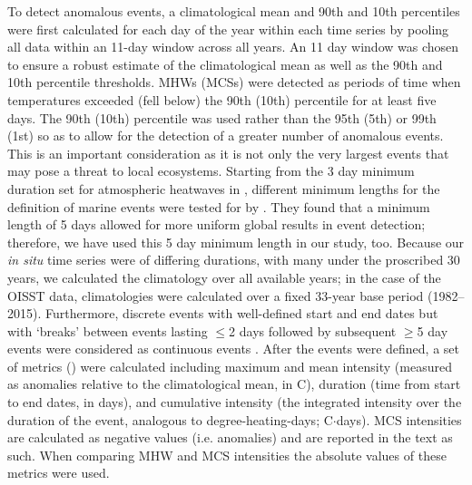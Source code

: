 \documentclass[a4paper,10pt,review]{elsarticle}
\begin{document}
To detect anomalous events, a climatological mean and 90th and 10th percentiles were first calculated for each day of the year within each time series by pooling all data within an 11-day window across all years. An 11 day window was chosen to ensure a robust estimate of the climatological mean as well as the 90th and 10th percentile thresholds. MHWs (MCSs) were detected as periods of time when temperatures exceeded (fell below) the 90th (10th) percentile for at least five days. The 90th (10th) percentile was used rather than the 95th (5th) or 99th (1st) so as to allow for the detection of a greater number of anomalous events. This is an important consideration as it is not only the very largest events that may pose a threat to local ecosystems. Starting from the 3 day minimum duration set for atmospheric heatwaves in \citet{Perkins2013}, different minimum lengths for the definition of marine events were tested for by \citet{Hobday2016}. They found that a minimum length of 5 days allowed for more uniform global results in event detection; therefore, we have used this 5 day minimum length in our study, too. Because our \emph{in situ} time series were of differing durations, with many under the proscribed 30 years, we calculated the climatology over all available years; in the case of the OISST data, climatologies were calculated over a fixed 33-year base period (1982--2015). Furthermore, discrete events with well-defined start and end dates but with `breaks' between events lasting $\leq$2 days followed by subsequent $\geq$5 day events were considered as continuous events \citep{Hobday2016}. After the events were defined, a set of metrics () were calculated including maximum and mean intensity (measured as anomalies relative to the climatological mean, in \degree C), duration (time from start to end dates, in days), and cumulative intensity (the integrated intensity over the duration of the event, analogous to degree-heating-days; \degree C$\cdot$days). MCS intensities are calculated as negative values (i.e. anomalies) and are reported in the text as such. When comparing MHW and MCS intensities the absolute values of these metrics were used.
\end{document}
